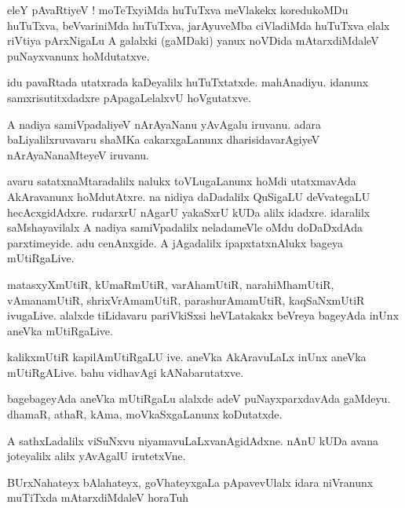 \documentclass{article}
\begin{document}
\begin{mn}%
eleY pAvaRtiyeV ! moTeTxyiMda huTuTxva meVlakekx koredukoMDu huTuTxva, beVvariniMda huTuTxva, 
jarAyuveMba ciVladiMda huTuTxva elalx riVtiya pArxNigaLu A galalxki (gaMDaki) yanux noVDida 
mAtarxdiMdaleV puNayxvanunx hoMdutatxve.
\end{mn}

\begin{mn}%
idu pavaRtada utatxrada kaDeyalilx huTuTxtatxde. mahAnadiyu. idanunx samxrisutitxdadxre 
pApagaLelalxvU hoVgutatxve.
\end{mn}

\begin{mn}%
A nadiya samiVpadaliyeV nArAyaNanu yAvAgalu iruvanu. adara baLiyalilxruvavaru shaMKa cakarxgaLanunx 
dharisidavarAgiyeV nArAyaNanaMteyeV iruvanu.
\end{mn}

\begin{mn}%
avaru satatxnaMtaradalilx nalukx toVLugaLanunx hoMdi utatxmavAda AkAravanunx hoMdutAtxre. na nidiya 
daDadalilx QuSigaLU deVvategaLU hecAcxgidAdxre. rudarxrU nAgarU yakaSxrU kUDa alilx idadxre. 
idaralilx saMshayavilalx A nadiya samiVpadalilx neladameVle oMdu doDaDxdAda parxtimeyide. adu 
cenAnxgide. A jAgadalilx ipapxtatxnAlukx bageya mUtiRgaLive.
\end{mn}

\begin{mn}%
matasxyXmUtiR, kUmaRmUtiR, varAhamUtiR, narahiMhamUtiR, vAmanamUtiR, shrixVrAmamUtiR, 
parashurAmamUtiR, kaqSaNxmUtiR ivugaLive. alalxde tiLidavaru pariVkiSxsi heVLatakakx beVreya 
bageyAda inUnx aneVka mUtiRgaLive.
\end{mn}

\begin{mn}%
kalikxmUtiR kapilAmUtiRgaLU ive. aneVka AkAravuLaLx inUnx aneVka mUtiRgALive. bahu vidhavAgi 
kANabarutatxve.
\end{mn}

\begin{mn}%
bagebageyAda aneVka mUtiRgaLu alalxde adeV puNayxparxdavAda gaMdeyu. dhamaR, athaR, kAma, 
moVkaSxgaLanunx koDutatxde.
\end{mn}

\begin{mn}%
A sathxLadalilx viSuNxvu niyamavuLaLxvanAgidAdxne. nAnU kUDa avana joteyalilx alilx yAvAgalU 
irutetxVne.
\end{mn}

\begin{mn}%
BUrxNahateyx bAlahateyx, goVhateyxgaLa pApavevUlalx idara niVranunx muTiTxda mAtarxdiMdaleV horaTuh
\end{mn}
\end{document}
